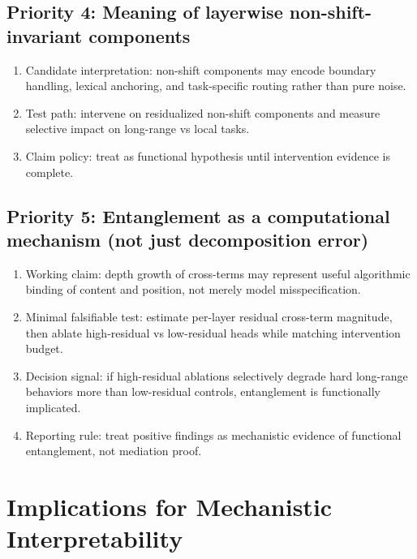 \documentclass[11pt]{article}
\begin{document}
\subsection*{Priority 4: Meaning of layerwise non-shift-invariant components}
\begin{enumerate}[leftmargin=*]
  \item Candidate interpretation: non-shift components may encode boundary handling, lexical anchoring, and task-specific routing rather than pure noise.
  \item Test path: intervene on residualized non-shift components and measure selective impact on long-range vs local tasks.
  \item Claim policy: treat as functional hypothesis until intervention evidence is complete.
\end{enumerate}

\subsection*{Priority 5: Entanglement as a computational mechanism (not just decomposition error)}
\begin{enumerate}[leftmargin=*]
  \item Working claim: depth growth of cross-terms may represent useful algorithmic binding of content and position, not merely model misspecification.
  \item Minimal falsifiable test: estimate per-layer residual cross-term magnitude, then ablate high-residual vs low-residual heads while matching intervention budget.
  \item Decision signal: if high-residual ablations selectively degrade hard long-range behaviors more than low-residual controls, entanglement is functionally implicated.
  \item Reporting rule: treat positive findings as mechanistic evidence of functional entanglement, not mediation proof.
\end{enumerate}

\section{Implications for Mechanistic Interpretability}
\end{document}
